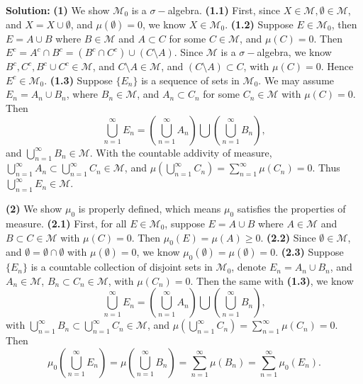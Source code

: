 \documentclass{article}%
\begin{document}
\begin{enumerate}
\textbf{Solution:}
\textbf{(1)} We show $\mathcal{M}_0$ is a $\sigma-$algebra. \textbf{(1.1)} First, since $X\in \mathcal{M}, \emptyset\in\mathcal{M}$, and $X = X\cup\emptyset$, and $\mu(\emptyset) = 0$, we know $X\in\mathcal{M}_0$. \textbf{(1.2)} Suppose $E\in \mathcal{M}_0$, then $E = A\cup B$ where $B\in \mathcal{M}$ and $A\subset C$ for some $C\in\mathcal{M}$, and $\mu(C) = 0$. Then $E^c = A^c\cap B^c = (B^c\cap C^c)\cup(C\setminus A)$. Since $\mathcal{M}$ is a $\sigma-$algebra, we know $B^c, C^c, B^c\cup C^c \in \mathcal{M}$, and $C\setminus A \in \mathcal{M}$, and $(C\setminus A)\subset C$, with $\mu(C) = 0$. Hence $E^c\in\mathcal{M}_0 $. \textbf{(1.3)} Suppose $\{E_n\}$ is a sequence of sets in $\mathcal{M}_0$. We may assume $E_n = A_n\cup B_n$, where $B_n\in\mathcal{M}$, and $A_n\subset C_n$ for some $C_n\in\mathcal{M}$ with $\mu(C) = 0$. Then 
$$
\bigcup\limits_{n=1}^{\infty}E_n = \left(\bigcup\limits_{n=1}^{\infty}A_n\right) \bigcup \left(\bigcup\limits_{n=1}^{\infty}B_n \right),
$$
and $\bigcup\limits_{n=1}^{\infty}B_n\in\mathcal{M} $. With the countable addivity of measure, $\bigcup\limits_{n=1}^{\infty}A_n\subset \bigcup\limits_{n=1}^{\infty}C_n\in\mathcal{M} $, and $\mu\left(\bigcup\limits_{n=1}^{\infty}C_n\right) = \sum\limits_{n=1}^{\infty}\mu(C_n) = 0$. Thus $\bigcup\limits_{n=1}^{\infty}E_n\in\mathcal{M} $.

\textbf{(2)} We show $\mu_0$ is properly defined, which means $\mu_0$ satisfies the properties of measure. \textbf{(2.1)} First, for all $E\in\mathcal{M}_0$, suppose $E = A\cup B$ where $A\in\mathcal{M}$ and $B\subset C\in\mathcal{M}$ with $\mu(C) = 0$. Then $\mu_0(E) = \mu(A) \ge 0$. \textbf{(2.2)} Since $\emptyset\in\mathcal{M}$, and $\emptyset = \emptyset \cap \emptyset$ with $\mu(\emptyset) = 0$, we know $\mu_0(\emptyset) = \mu(\emptyset) = 0$. \textbf{(2.3)} Suppose $\{E_n\}$ is a countable collection of disjoint sets in $\mathcal{M}_0$, denote $E_n = A_n\cup B_n$, and $A_n\in\mathcal{M}$, $B_n\subset C_n\in\mathcal{M}$, with $\mu(C_n) = 0$. Then the same with \textbf{(1.3)}, we know
$$
\bigcup\limits_{n=1}^{\infty}E_n = \left(\bigcup\limits_{n=1}^{\infty}A_n\right) \bigcup \left(\bigcup\limits_{n=1}^{\infty}B_n \right),
$$
with $\bigcup\limits_{n=1}^{\infty}B_n\subset \bigcup\limits_{n=1}^{\infty}C_n\in\mathcal{M} $, and $\mu\left(\bigcup\limits_{n=1}^{\infty}C_n\right) = \sum\limits_{n=1}^{\infty}\mu(C_n) = 0$. Then
$$
\mu_0\left(\bigcup_{n=1}^{\infty}E_n\right) = \mu\left(\bigcup_{n=1}^{\infty}B_n\right) = \sum_{n=1}^{\infty}\mu(B_n) = \sum_{n=1}^{\infty}\mu_0(E_n).
$$


\end{enumerate}
\end{document}
